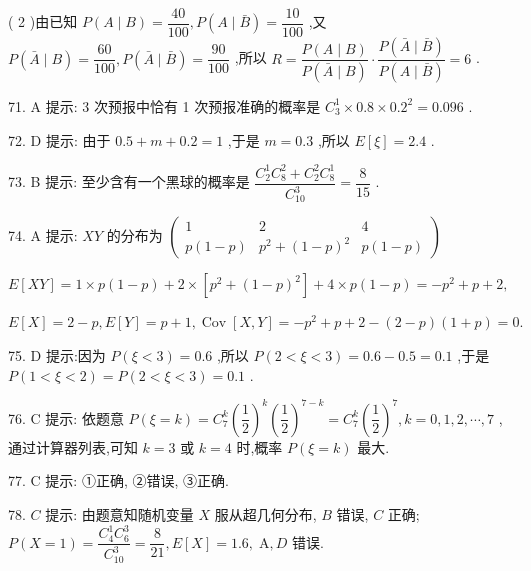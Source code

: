 ( 2 )由已知 $P\left( {A \mid  B}\right)  = \dfrac{40}{100},P\left( {A \mid  \bar{B}}\right)  = \dfrac{10}{100}$ ,又 $P\left( {\bar{A} \mid  B}\right)  = \dfrac{60}{100},P\left( {\bar{A} \mid  \bar{B}}\right)  = \dfrac{90}{100}$ ,所以 $R = \dfrac{P\left( {A \mid  B}\right) }{P\left( {\bar{A} \mid  B}\right) } \cdot  \dfrac{P\left( {\bar{A} \mid  \bar{B}}\right) }{P\left( {A \mid  \bar{B}}\right) } = 6$ .

71. A 提示: 3 次预报中恰有 1 次预报准确的概率是 ${C}_{3}^{1} \times  {0.8} \times  {0.2}^{2} = {0.096}$ .

72. D 提示: 由于 ${0.5} + m + {0.2} = 1$ ,于是 $m = {0.3}$ ,所以 $E\left\lbrack  \xi \right\rbrack   = {2.4}$ .

73. B 提示: 至少含有一个黑球的概率是 $\dfrac{{C}_{2}^{1}{C}_{8}^{2} + {C}_{2}^{2}{C}_{8}^{1}}{{C}_{10}^{3}} = \dfrac{8}{15}$ .

74. A 提示: ${XY}$ 的分布为 $\left( \begin{matrix} 1 & 2 & 4 \\  p\left( {1 - p}\right) & {p}^{2} + {\left( 1 - p\right) }^{2} & p\left( {1 - p}\right)  \end{matrix}\right)$

$E\left\lbrack  {XY}\right\rbrack   = 1 \times  p\left( {1 - p}\right)  + 2 \times  \left\lbrack  {{p}^{2} + {\left( 1 - p\right) }^{2}}\right\rbrack   + 4 \times  p\left( {1 - p}\right)  =  - {p}^{2} + p + 2,$

$E\left\lbrack  X\right\rbrack   = 2 - p,E\left\lbrack  Y\right\rbrack   = p + 1,\operatorname{Cov}\left\lbrack  {X,Y}\right\rbrack   =  - {p}^{2} + p + 2 - \left( {2 - p}\right) \left( {1 + p}\right)  = 0.$

75. D 提示:因为 $P\left( {\xi  < 3}\right)  = {0.6}$ ,所以 $P\left( {2 < \xi  < 3}\right)  = {0.6} - {0.5} = {0.1}$ ,于是 $P\left( {1 < \xi  < 2}\right)  = P\left( {2 < \xi  < 3}\right)  = {0.1}$ .

76. C 提示: 依题意 $P\left( {\xi  = k}\right)  = {C}_{7}^{k}{\left( \dfrac{1}{2}\right) }^{k}{\left( \dfrac{1}{2}\right) }^{7 - k} = {C}_{7}^{k}{\left( \dfrac{1}{2}\right) }^{7},k = 0,1,2,\cdots ,7$ ,通过计算器列表,可知 $k = 3$ 或 $k = 4$ 时,概率 $P\left( {\xi  = k}\right)$ 最大.

77. C 提示: ①正确, ②错误, ③正确.

78. $C$ 提示: 由题意知随机变量 $X$ 服从超几何分布, $B$ 错误, $C$ 正确; $P\left( {X = 1}\right)  = \dfrac{{C}_{4}^{1}{C}_{6}^{3}}{{C}_{10}^{3}} = \dfrac{8}{21},E\left\lbrack  X\right\rbrack   = {1.6},\mathrm{\;A},D$ 错误.


